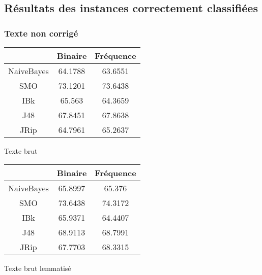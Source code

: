 \documentclass[a4paper,11pt]{report}
\begin{document}
\subsection{Résultats des instances correctement classifiées}

\subsubsection{Texte non corrigé}

\begin{minipage}{0.5\textwidth}
\begin{tabular}{|c|c|c|}
\hline
 & Binaire & Fréquence \\
 \hline
 NaiveBayes & 64.1788 & 63.6551 \\
 \hline
 SMO & 73.1201 & 73.6438 \\
 \hline
 IBk & 65.563 & 64.3659 \\
 \hline
 J48 & 67.8451 & 67.8638 \\
 \hline
 JRip & 64.7961 & 65.2637 \\
 \hline
\end{tabular}
\caption{Texte brut}
\end{minipage}
\begin{minipage}{0.5\textwidth}
\begin{tabular}{|c|c|c|}
\hline
 & Binaire & Fréquence \\
 \hline
 NaiveBayes & 65.8997 & 65.376 \\
 \hline
 SMO & 73.6438 & 74.3172 \\
 \hline
 IBk & 65.9371 & 64.4407 \\
 \hline
 J48 & 68.9113 & 68.7991 \\
 \hline
 JRip & 67.7703 & 68.3315 \\
 \hline
\end{tabular}
\caption{Texte brut lemmatisé}
\end{minipage}

\vspace{1cm}
\end{document}

